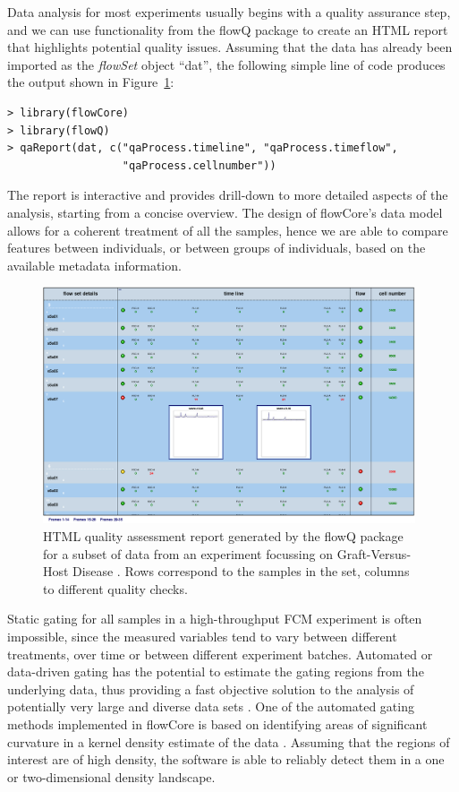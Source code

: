 \documentclass[12pt]{article}
\newcommand{\Rpackage}[1]{{\textsf{#1}}}
\newcommand{\Rclass}[1]{{\textit{#1}}}
\begin{document}
Data analysis for most experiments usually begins with a quality
assurance step, and we can use functionality from the \Rpackage{flowQ}
package to create an HTML report that highlights potential quality
issues. Assuming that the data has already been imported as the
\Rclass{flowSet} object ``dat'', the following simple line of code
produces the output shown in Figure~\ref{flowQ}:

\begin{verbatim}
> library(flowCore)
> library(flowQ)
> qaReport(dat, c("qaProcess.timeline", "qaProcess.timeflow", 
                  "qaProcess.cellnumber"))
\end{verbatim}

The report is interactive and provides drill-down to more detailed
aspects of the analysis, starting from a concise overview. The design of \Rpackage{flowCore}'s data model
allows for a coherent treatment of all the samples, hence we are able
to compare features between individuals, or between groups of
individuals, based on the available metadata information.


\begin{figure}[htbp]
\centering
\includegraphics[width=0.98\textwidth]{flowQ.jpg}
\caption{\label{flowQ}%
  HTML quality assessment report generated by the flowQ package for a
  subset of data from an experiment focussing on Graft-Versus-Host
  Disease \citep{brinkman2007hcf}. Rows correspond to the samples in
  the set, columns to different quality checks.}
\end{figure}

Static gating for all samples in a high-throughput FCM experiment is
often impossible, since the measured variables tend to vary between
different treatments, over time or between different experiment
batches. Automated or data-driven gating has the potential to estimate
the gating regions from the underlying data, thus providing a fast
objective solution to the analysis of potentially very large and
diverse data sets \citep{lo2008agf}. One of the automated gating
methods implemented in \Rpackage{flowCore} is based on identifying
areas of significant curvature in a kernel density estimate of the
data \citep{wand2008}. Assuming that the regions of interest are of
high density, the software is able to reliably detect them in a one or
two-dimensional density landscape.
\end{document}
